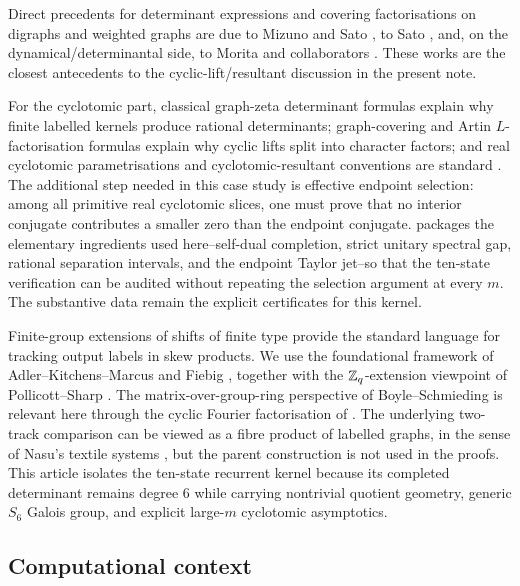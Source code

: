 Direct precedents for determinant expressions and covering
factorisations on digraphs and weighted graphs are due to Mizuno and
Sato \cite{MizunoSato2000,MizunoSato2001,MizunoSato2002,MizunoSato2004},
to Sato \cite{Sato2006}, and, on the dynamical/determinantal side, to
Morita and collaborators
\cite{Morita2020,IdeIshikawaMoritaSatoSegawa2021}. These works are the
closest antecedents to the cyclic-lift/resultant discussion in the
present note.

For the cyclotomic part, classical graph-zeta determinant formulas
explain why finite labelled kernels produce rational determinants;
graph-covering and Artin \(L\)-factorisation formulas explain why cyclic
lifts split into character factors; and real cyclotomic parametrisations
and cyclotomic-resultant conventions are standard
\cite{Apostol1970,CoxLittleOShea2005}.  The additional step needed in this case study is
effective endpoint selection: among all primitive real cyclotomic
slices, one must prove that no interior conjugate contributes a smaller
zero than the endpoint conjugate.  
packages the elementary ingredients used here--self-dual completion,
strict unitary spectral gap, rational separation intervals, and the
endpoint Taylor jet--so that the ten-state verification can be audited
without repeating the selection argument at every \(m\).  The
substantive data remain the explicit certificates for this kernel.

Finite-group extensions of shifts of finite type provide the standard
language for tracking output labels in skew products. We use the
foundational framework of Adler--Kitchens--Marcus
\cite{AdlerKitchensMarcus1985} and Fiebig \cite{Fiebig1993}, together
with the \(\mathbb{Z}_q\)-extension viewpoint of Pollicott--Sharp
\cite{PollicottSharp1994}. The matrix-over-group-ring perspective of
Boyle--Schmieding \cite{BoyleSchmieding2017} is relevant here through
the cyclic Fourier factorisation of
. The underlying two-track
comparison can be viewed as a fibre product of labelled graphs, in the
sense of Nasu's textile systems \cite{Nasu1995}, but the parent
construction is not used in the proofs.  This article isolates the
ten-state recurrent kernel because its completed determinant remains
degree \(6\) while carrying nontrivial quotient geometry, generic
\(S_6\) Galois group, and explicit large-\(m\) cyclotomic asymptotics.


\subsection{Computational context}

